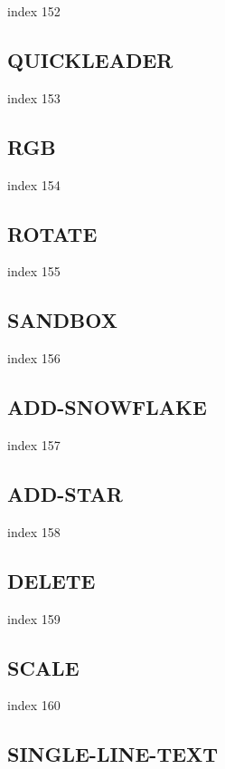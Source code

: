\documentclass[a4paper]{report}
\begin{document}
{{{{{{{{{{{{{index 152

\subsection{QUICKLEADER}

index 153

\subsection{RGB}

 index 154

\subsection{ROTATE}

index 155

\subsection{SANDBOX}

index 156

\subsection{ADD-SNOWFLAKE}

index 157

\subsection{ADD-STAR}

index 158

\subsection{DELETE}

index 159

\subsection{SCALE}

index 160

\subsection{SINGLE-LINE-TEXT}

}}}}}}}}}}}}}
\end{document}
